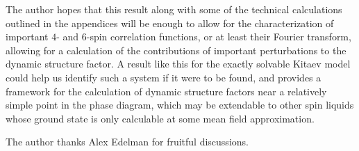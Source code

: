 \documentclass[aps,pra,preprint,groupedaddress]{revtex4-1}
\newcommand{\1}{\mathds{1}}
\begin{document}
The author hopes that this result along with some of the technical calculations outlined in the appendices will be enough to allow for the characterization of important $4$- and $6$-spin correlation functions, or at least their Fourier transform, allowing for a calculation of the contributions of important perturbations to the dynamic structure factor. A result like this for the exactly solvable Kitaev model could help us identify such a system if it were to be found, and provides a framework for the calculation of dynamic structure factors near a relatively simple point in the phase diagram, which may be extendable to other spin liquids whose ground state is only calculable at some mean field approximation.









\begin{acknowledgments}
	
	The author thanks Alex Edelman for fruitful discussions.
	
\end{acknowledgments}

\appendix

\end{document}
